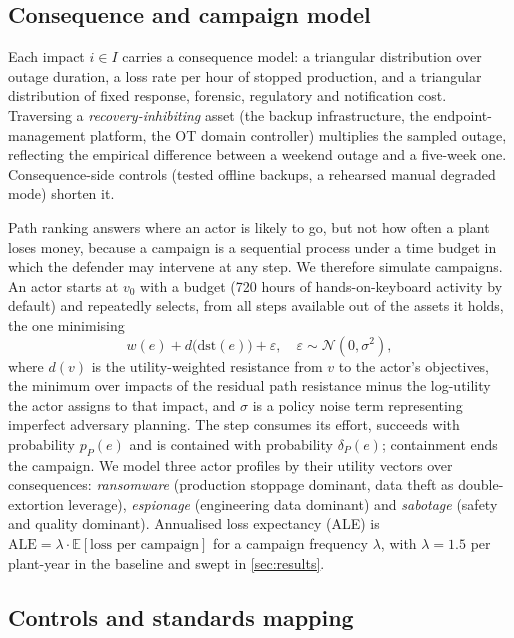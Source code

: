 \subsection{Consequence and campaign model}

Each impact $i \in I$ carries a consequence model: a triangular distribution
over outage duration, a loss rate per hour of stopped production, and a
triangular distribution of fixed response, forensic, regulatory and
notification cost. Traversing a \emph{recovery-inhibiting} asset (the backup infrastructure, the
endpoint-management platform, the OT domain controller) multiplies the sampled outage, reflecting the empirical difference between a
weekend outage and a five-week one. Consequence-side controls (tested offline
backups, a rehearsed manual degraded mode) shorten it.

Path ranking answers where an actor is likely to go, but not how often a plant
loses money, because a campaign is a sequential process under a time budget in
which the defender may intervene at any step. We therefore simulate campaigns.
An actor starts at $v_0$ with a budget (720 hours of hands-on-keyboard activity
by default) and repeatedly selects, from all steps available out of the assets
it holds, the one minimising
\begin{equation}
w(e) + d\bigl(\mathrm{dst}(e)\bigr) + \varepsilon,\quad
\varepsilon \sim \mathcal{N}(0,\sigma^2),
\end{equation}
where $d(v)$ is the utility-weighted resistance from $v$ to the actor's
objectives, the minimum over impacts of the residual path resistance minus the
log-utility the actor assigns to that impact, and $\sigma$ is a policy noise
term representing imperfect adversary planning. The step consumes its
effort, succeeds with probability $p_P(e)$ and is contained with probability
$\delta_P(e)$; containment ends the campaign. We model three actor profiles by
their utility vectors over consequences: \emph{ransomware} (production
stoppage dominant, data theft as double-extortion leverage), \emph{espionage}
(engineering data dominant) and \emph{sabotage} (safety and quality dominant).
Annualised loss expectancy (ALE) is $\mathrm{ALE} = \lambda \cdot
\mathbb{E}[\text{loss per campaign}]$ for a campaign frequency $\lambda$, with $\lambda = 1.5$ per
plant-year in the baseline and swept in \cref{sec:results}.

\subsection{Controls and standards mapping}

